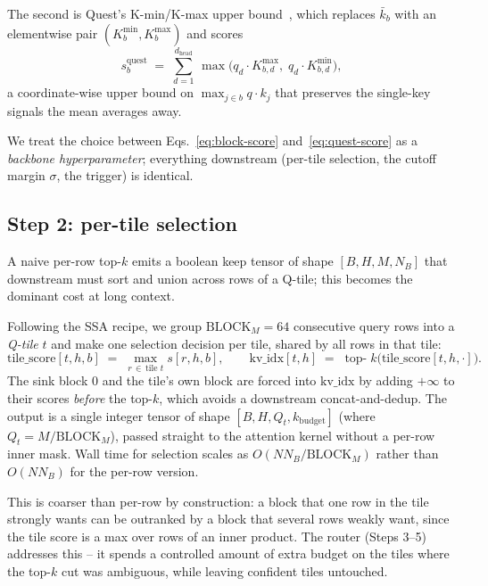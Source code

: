 \documentclass[11pt]{article}
\theoremstyle{remark}
\newcommand{\kbudget}{k_{\text{budget}}}
\newcommand{\NB}{N_{\!B}}
\newcommand{\dhead}{d_{\text{head}}}
\newcommand{\BlockM}{\text{BLOCK}_M}
\begin{document}
The second is Quest's K-min/K-max upper bound~\citep{tang2024quest}, which replaces $\bar k_b$ with an elementwise pair $(K^{\min}_b, K^{\max}_b)$ and scores
\begin{equation}\label{eq:quest-score}
s^{\text{quest}}_{b} \;=\; \sum_{d=1}^{\dhead}\, \max\!\bigl(q_d \cdot K^{\max}_{b,d},\; q_d \cdot K^{\min}_{b,d}\bigr),
\end{equation}
a coordinate-wise upper bound on $\max_{j \in b} q \cdot k_j$ that preserves the single-key signals the mean averages away.

We treat the choice between Eqs.~\eqref{eq:block-score} and~\eqref{eq:quest-score} as a \emph{backbone hyperparameter}; everything downstream (per-tile selection, the cutoff margin $\sigma$, the trigger) is identical.

\subsection{Step 2: per-tile selection}

A naive per-row top-$k$ emits a boolean keep tensor of shape $[B, H, M, \NB]$ that downstream must sort and union across rows of a Q-tile; this becomes the dominant cost at long context.

Following the SSA recipe, we group $\BlockM = 64$ consecutive query rows into a \emph{Q-tile} $t$ and make one selection decision per tile, shared by all rows in that tile:
\begin{equation}\label{eq:tile-score}
\text{tile\_score}[t,h,b] \;=\; \max_{r\,\in\,\text{tile }t} s[r,h,b],
\qquad
\text{kv\_idx}[t,h] \;=\; \operatorname*{top-}k\bigl(\text{tile\_score}[t,h,\cdot]\bigr).
\end{equation}
The sink block $0$ and the tile's own block are forced into $\text{kv\_idx}$ by adding $+\infty$ to their scores \emph{before} the top-$k$, which avoids a downstream concat-and-dedup. The output is a single integer tensor of shape $[B, H, Q_t, \kbudget]$ (where $Q_t = M/\BlockM$), passed straight to the attention kernel without a per-row inner mask. Wall time for selection scales as $O(N \NB / \BlockM)$ rather than $O(N \NB)$ for the per-row version.

This is coarser than per-row by construction: a block that one row in the tile strongly wants can be outranked by a block that several rows weakly want, since the tile score is a max over rows of an inner product. The router (Steps 3--5) addresses this -- it spends a controlled amount of extra budget on the tiles where the top-$k$ cut was ambiguous, while leaving confident tiles untouched.
\end{document}
